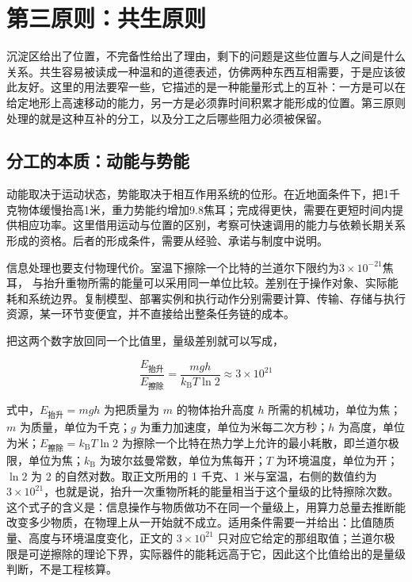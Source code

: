 \section{第三原则：共生原则}

沉淀区给出了位置，不完备性给出了理由，剩下的问题是这些位置与人之间是什么关系。共生容易被读成一种温和的道德表述，仿佛两种东西互相需要，于是应该彼此友好。这里的用法要窄一些，它描述的是一种能量形式上的互补：一方是可以在给定地形上高速移动的能力，另一方是必须靠时间积累才能形成的位置。第三原则处理的就是这种互补的分工，以及分工之后哪些阻力必须被保留。

\subsection{分工的本质：动能与势能}

动能取决于运动状态，势能取决于相互作用系统的位形。在近地面条件下，把1千克物体缓慢抬高1米，重力势能约增加9.8焦耳；完成得更快，需要在更短时间内提供相应功率。这里借用运动与位置的区别，考察可快速调用的能力与依赖长期关系形成的资格。后者的形成条件，需要从经验、承诺与制度中说明。


信息处理也要支付物理代价。室温下擦除一个比特的兰道尔下限约为$3\times10^{-21}$焦耳，\cite{landauer1961} 与抬升重物所需的能量可以采用同一单位比较。差别在于操作对象、实际能耗和系统边界。复制模型、部署实例和执行动作分别需要计算、传输、存储与执行资源，某一环节变便宜，并不直接给出整条任务链的成本。

把这两个数字放回同一个比值里，量级差别就可以写成，

\begin{equation}
\frac{E_{\text{抬升}}}{E_{\text{擦除}}}=\frac{mgh}{k_{\mathrm{B}}T\ln 2}\approx 3\times10^{21}
\end{equation}

式中，$E_{\text{抬升}}=mgh$ 为把质量为 $m$ 的物体抬升高度 $h$ 所需的机械功，单位为焦；$m$ 为质量，单位为千克；$g$ 为重力加速度，单位为米每二次方秒；$h$ 为高度，单位为米；$E_{\text{擦除}}=k_{\mathrm{B}}T\ln 2$ 为擦除一个比特在热力学上允许的最小耗散，即兰道尔极限，单位为焦；$k_{\mathrm{B}}$ 为玻尔兹曼常数，单位为焦每开；$T$ 为环境温度，单位为开；$\ln 2$ 为 2 的自然对数。取正文所用的 1 千克、1 米与室温，右侧的数值约为 $3\times10^{21}$，也就是说，抬升一次重物所耗的能量相当于这个量级的比特擦除次数。这个式子的含义是：信息操作与物质做功不在同一个量级上，用算力总量去推断能改变多少物质，在物理上从一开始就不成立。适用条件需要一并给出：比值随质量、高度与环境温度变化，正文的 $3\times10^{21}$ 只对应它给定的那组取值；兰道尔极限是可逆擦除的理论下界，实际器件的能耗远高于它，因此这个比值给出的是量级判断，不是工程核算。

